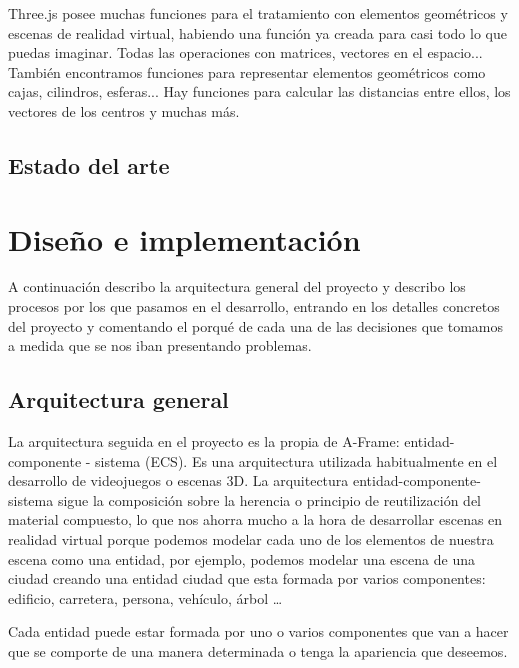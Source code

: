 \documentclass[a4paper, 12pt]{book}
\begin{document}
Three.js posee muchas funciones para el tratamiento con elementos geométricos y escenas de realidad virtual, habiendo una función ya creada para casi todo lo que puedas imaginar. Todas las operaciones con matrices, vectores en el espacio... También encontramos funciones para representar elementos geométricos como cajas, cilindros, esferas... Hay funciones para calcular las distancias entre ellos, los vectores de los centros y muchas más.

\section{ Estado del arte} 
\label{sec:three}


\cleardoublepage
\chapter{Diseño e implementación}

A continuación describo la arquitectura general del proyecto y describo los procesos por los que pasamos en el desarrollo, entrando en los detalles concretos del proyecto y comentando el porqué de cada una de las decisiones que tomamos a medida que se nos iban presentando problemas.
\section{Arquitectura general} 
\label{sec:arquitectura}

La arquitectura seguida en el proyecto es la propia de A-Frame:  entidad- componente - sistema (ECS). Es una arquitectura utilizada habitualmente en el desarrollo de videojuegos o escenas 3D. La arquitectura  entidad-componente-sistema sigue la composición sobre la herencia o principio de reutilización del material compuesto, lo que nos ahorra mucho a la hora de desarrollar escenas en realidad virtual porque podemos modelar cada uno de los elementos de nuestra escena como una entidad, por ejemplo, podemos modelar una escena de una ciudad creando una entidad ciudad que esta formada por varios componentes: edificio, carretera, persona, vehículo, árbol \dots

Cada entidad puede estar formada por uno o varios componentes que van a hacer que se comporte de una manera determinada o tenga la apariencia que deseemos.
\end{document}
